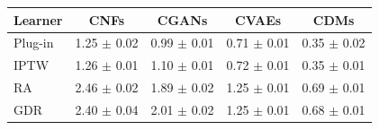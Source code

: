 \begin{tabu}{l|cccc}
\toprule
Learner & CNFs & CGANs & CVAEs & CDMs \\
\midrule
Plug-in & 1.25 $\pm$ 0.02 & 0.99 $\pm$ 0.01 & 0.71 $\pm$ 0.01 & 0.35 $\pm$ 0.02 \\
IPTW & 1.26 $\pm$ 0.01 & 1.10 $\pm$ 0.01 & 0.72 $\pm$ 0.01 & 0.35 $\pm$ 0.01 \\
RA & 2.46 $\pm$ 0.02 & 1.89 $\pm$ 0.02 & 1.25 $\pm$ 0.01 & 0.69 $\pm$ 0.01 \\
GDR & 2.40 $\pm$ 0.04 & 2.01 $\pm$ 0.02 & 1.25 $\pm$ 0.01 & 0.68 $\pm$ 0.01 \\
\bottomrule
\end{tabu}

